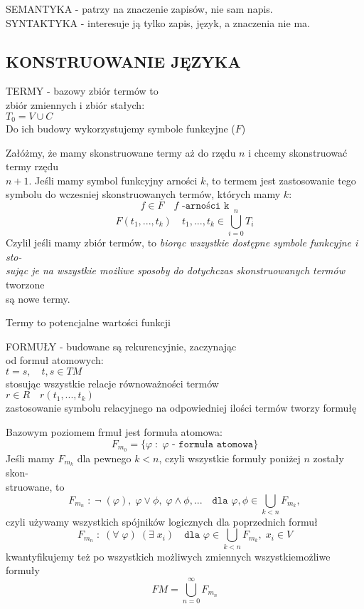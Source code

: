 {\color{def}SEMANTYKA} - patrzy na znaczenie zapisów, nie sam napis.\\
{\color{def}SYNTAKTYKA} - interesuje ją tylko zapis, język, a znaczenia nie ma.

\subsection{KONSTRUOWANIE JĘZYKA}
\begin{center}\large
    {\color{def}TERMY} - bazowy zbiór termów to \\zbiór zmiennych i zbiór stałych:\smallskip\\
    $T_0=V\cup C$\smallskip\\
    {\normalsize Do ich budowy wykorzystujemy symbole funkcyjne ($F$)}
\end{center}
Załóżmy, że mamy skonstruowane termy aż do rzędu $n$ i chcemy skonstruować termy rzędu \\$n+1$. Jeśli mamy symbol funkcyjny arności $k$, to {\color{emp}termem jest zastosowanie tego symbolu do wczesniej skonstruowanych termów}, których mamy $k$:
$$f\in F\quad f\texttt{ -arności k}$$
$$F(t_1, ..., t_k)\quad t_1, ..., t_k\in \bigcup\limits_{i=0}^n T_i$$
Czylil jeśli mamy zbiór termów, to \emph{\color{emp}biorąc wszystkie dostępne symbole funkcyjne i sto-\\sując je na wszystkie możliwe sposoby do dotychczas skonstruowanych termów} tworzone \\są nowe termy.\medskip
\begin{center}Termy to potencjalne wartości funkcji\end{center}\bigskip
\begin{center}\large
    {\color{def}FORMUŁY} - budowane są rekurencyjnie, zaczynając \\od formuł atomowych:\smallskip\\
    $t=s,\quad t,s\in TM$\smallskip\\
    stosując wszystkie relacje równoważności termów\smallskip\\
    $r\in R\quad r(t_1, ..., t_k)$\smallskip\\
    {\normalsize zastosowanie symbolu relacyjnego na odpowiedniej ilości termów tworzy formułę}
\end{center}\medskip
Bazowym poziomem frmuł jest formuła atomowa:
$$F_{m_0}=\{\varphi\;:\;\varphi\texttt{ - formuła atomowa}\}$$
Jeśli mamy $F_{m_k}$ dla pewnego $k<n$, czyli wszystkie formuły poniżej $n$ zostały skon-\\struowane, to
$$F_{m_n}\;:\;\neg\;(\varphi),\;\varphi\lor\phi,\;\varphi\land\phi,...\quad \texttt{dla }\varphi,\phi\in\bigcup\limits_{k<n}F_{m_k},$$
czyli {\color{emp}używamy wszystkich spójników logicznych} dla poprzednich formuł
$$F_{m_n}\;:\;(\forall\;\varphi)\;(\exists\;x_i)\quad \texttt{dla }\varphi\in\bigcup\limits_{k<n}F_{m_k},\;x_i\in V$$
{\color{emp}kwantyfikujemy też po wszystkich możliwych zmiennych wszystkiemożliwe formuły}
$$FM = \bigcup\limits_{n=0}^\infty F_{m_n}$$

